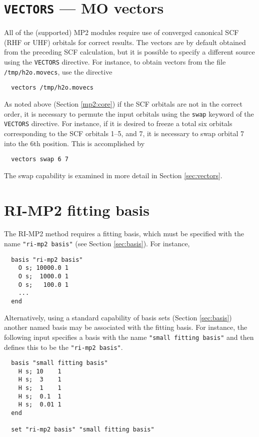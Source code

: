 \section{{\tt VECTORS} --- MO vectors}
\label{sec:mp2vectors}

All of the (supported) MP2 modules require use of converged canonical
SCF (RHF or UHF) orbitals for correct results.  The vectors are by
default obtained from the preceding SCF calculation, but it is
possible to specify a different source using the \verb+VECTORS+
directive.  For instance, to obtain vectors from the file
\verb+/tmp/h2o.movecs+, use the directive
\begin{verbatim}
  vectors /tmp/h2o.movecs
\end{verbatim}

As noted above (Section \ref{mp2:core}) if the SCF orbitals are not in
the correct order, it is necessary to permute the input orbitals using
the \verb+swap+ keyword of the \verb+VECTORS+ directive.  For
instance, if it is desired to freeze a total six orbitals
corresponding to the SCF orbitals 1--5, and 7, it is necessary to swap
orbital 7 into the 6th position.  This is accomplished by
\begin{verbatim}
  vectors swap 6 7
\end{verbatim}
The swap capability is examined in more detail in Section
\ref{sec:vectors}.


\section{RI-MP2 fitting basis}

\sloppy

The RI-MP2 method requires a fitting basis, which must be specified
with the name \verb+"ri-mp2 basis"+ (see Section \ref{sec:basis}).
For instance,
\begin{verbatim}
  basis "ri-mp2 basis"
    O s; 10000.0 1
    O s;  1000.0 1
    O s;   100.0 1
    ...
  end
\end{verbatim}

Alternatively, using a standard capability of basis sets (Section
\ref{sec:basis}) another named basis may be associated with the
fitting basis.  For instance, the following input specifies a basis
with the name \verb+"small fitting basis"+ and then defines this to be
the \verb+"ri-mp2 basis"+.
\begin{verbatim}
  basis "small fitting basis"
    H s; 10    1
    H s;  3    1
    H s;  1    1
    H s;  0.1  1
    H s;  0.01 1
  end

  set "ri-mp2 basis" "small fitting basis"
\end{verbatim}

